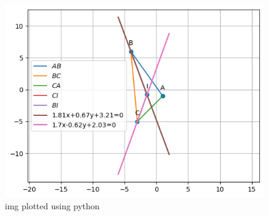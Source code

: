 \documentclass[journal,12pt,twocolumn]{IEEEtran}
\begin{document}
\begin{figure}[H]
\includegraphics[width=\columnwidth]{./codes/Incentre.png}
\caption{img plotted using python}
\end{figure}
\end{document}
